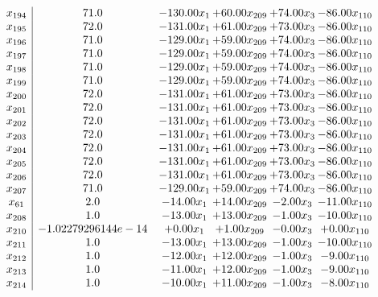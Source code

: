 \documentclass[8pt]{article}
\begin{document}
\[\begin{array}{c| c c@{\hskip 2pt} c@{\hskip 2pt} c@{\hskip 2pt} c@{\hskip 2pt} }
 x_{194}   &  71.0 & -130.00 x_{1} & + 60.00 x_{209} & + 74.00 x_{3} & -86.00 x_{110}\\
 x_{195}   &  72.0 & -131.00 x_{1} & + 61.00 x_{209} & + 73.00 x_{3} & -86.00 x_{110}\\
 x_{196}   &  71.0 & -129.00 x_{1} & + 59.00 x_{209} & + 74.00 x_{3} & -86.00 x_{110}\\
 x_{197}   &  71.0 & -129.00 x_{1} & + 59.00 x_{209} & + 74.00 x_{3} & -86.00 x_{110}\\
 x_{198}   &  71.0 & -129.00 x_{1} & + 59.00 x_{209} & + 74.00 x_{3} & -86.00 x_{110}\\
 x_{199}   &  71.0 & -129.00 x_{1} & + 59.00 x_{209} & + 74.00 x_{3} & -86.00 x_{110}\\
 x_{200}   &  72.0 & -131.00 x_{1} & + 61.00 x_{209} & + 73.00 x_{3} & -86.00 x_{110}\\
 x_{201}   &  72.0 & -131.00 x_{1} & + 61.00 x_{209} & + 73.00 x_{3} & -86.00 x_{110}\\
 x_{202}   &  72.0 & -131.00 x_{1} & + 61.00 x_{209} & + 73.00 x_{3} & -86.00 x_{110}\\
 x_{203}   &  72.0 & -131.00 x_{1} & + 61.00 x_{209} & + 73.00 x_{3} & -86.00 x_{110}\\
 x_{204}   &  72.0 & -131.00 x_{1} & + 61.00 x_{209} & + 73.00 x_{3} & -86.00 x_{110}\\
 x_{205}   &  72.0 & -131.00 x_{1} & + 61.00 x_{209} & + 73.00 x_{3} & -86.00 x_{110}\\
 x_{206}   &  72.0 & -131.00 x_{1} & + 61.00 x_{209} & + 73.00 x_{3} & -86.00 x_{110}\\
 x_{207}   &  71.0 & -129.00 x_{1} & + 59.00 x_{209} & + 74.00 x_{3} & -86.00 x_{110}\\
 x_{61}   &  2.0 & -14.00 x_{1} & + 14.00 x_{209} & -2.00 x_{3} & -11.00 x_{110}\\
 x_{208}   &  1.0 & -13.00 x_{1} & + 13.00 x_{209} & -1.00 x_{3} & -10.00 x_{110}\\
 x_{210}   &  -1.02279296144e-14 & +  0.00 x_{1} & +  1.00 x_{209} & -0.00 x_{3} & +  0.00 x_{110}\\
 x_{211}   &  1.0 & -13.00 x_{1} & + 13.00 x_{209} & -1.00 x_{3} & -10.00 x_{110}\\
 x_{212}   &  1.0 & -12.00 x_{1} & + 12.00 x_{209} & -1.00 x_{3} & -9.00 x_{110}\\
 x_{213}   &  1.0 & -11.00 x_{1} & + 12.00 x_{209} & -1.00 x_{3} & -9.00 x_{110}\\
 x_{214}   &  1.0 & -10.00 x_{1} & + 11.00 x_{209} & -1.00 x_{3} & -8.00 x_{110}\\

\end{array}\]
\end{document}
